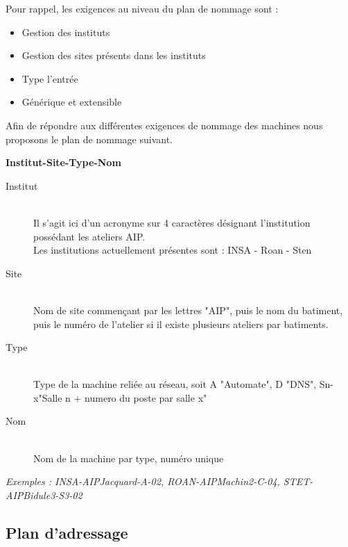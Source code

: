 \documentclass[a4paper]{article}
\begin{document}
	Pour rappel, les exigences au niveau du plan de nommage sont :\\
	\begin{itemize}
	\item Gestion des instituts
	\item Gestion des sites présents dans les instituts
	\item Type l'entrée
	\item Générique et extensible
	\end{itemize}	

	Afin de répondre aux différentes exigences de nommage des machines nous proposons le plan de nommage suivant.	
	
	\textbf{Institut-Site-Type-Nom}	
	
	\begin{description}
	\item[Institut]\hfill\\
	Il s'agit ici d'un acronyme sur 4 caractères désignant l'institution possédant les ateliers AIP.\\
	Les institutions actuellement présentes sont :  INSA - Roan - Sten
	
	\item[Site]\hfill\\
	Nom de site commençant par les lettres "AIP", puis le nom du batiment, puis le numéro de l'atelier si il existe plusieurs ateliers par batiments.
	
	\item[Type]\hfill\\
	Type de la machine reliée au réseau, soit A "Automate", D "DNS", Sn-x"Salle n + numero du poste par salle x"	
	
	\item[Nom]\hfill\\
	Nom de la machine par type, numéro unique	
	\end{description}	
	
	\textit{Exemples : INSA-AIPJacquard-A-02, ROAN-AIPMachin2-C-04, STET-AIPBidule3-S3-02}	
	

	\subsection{Plan d'adressage}

	
\end{document}
